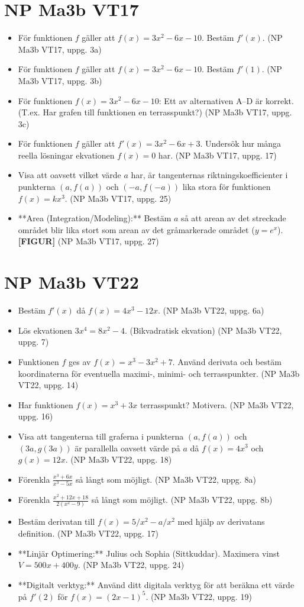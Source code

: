 \documentclass{article}
\begin{document}
\section*{NP Ma3b VT17}
\begin{itemize}
    \item För funktionen $f$ gäller att $f(x) = 3x^2 - 6x - 10$. Bestäm $f'(x)$. (NP Ma3b VT17, uppg. 3a)
    \item För funktionen $f$ gäller att $f(x) = 3x^2 - 6x - 10$. Bestäm $f'(1)$. (NP Ma3b VT17, uppg. 3b)
    \item För funktionen $f(x) = 3x^2 - 6x - 10$: Ett av alternativen A–D är korrekt. (T.ex. Har grafen till funktionen en terrasspunkt?) (NP Ma3b VT17, uppg. 3c)
    \item För funktionen $f$ gäller att $f'(x) = 3x^2 - 6x + 3$. Undersök hur många reella lösningar ekvationen $f(x)=0$ har. (NP Ma3b VT17, uppg. 17)
    \item Visa att oavsett vilket värde $a$ har, är tangenternas riktningskoefficienter i punkterna $(a, f(a))$ och $(-a, f(-a))$ lika stora för funktionen $f(x) = kx^3$. (NP Ma3b VT17, uppg. 25)
    \item **Area (Integration/Modeling):** Bestäm $a$ så att arean av det streckade området blir lika stort som arean av det gråmarkerade området ($y=e^x$). \textbf{[FIGUR]} (NP Ma3b VT17, uppg. 27)
\end{itemize}

\section*{NP Ma3b VT22}
\begin{itemize}
    \item Bestäm $f'(x)$ då $f(x) = 4x^3 - 12x$. (NP Ma3b VT22, uppg. 6a)
    \item Lös ekvationen $3x^4 = 8x^2 - 4$. (Bikvadratisk ekvation) (NP Ma3b VT22, uppg. 7)
    \item Funktionen $f$ ges av $f(x) = x^3 - 3x^2 + 7$. Använd derivata och bestäm koordinaterna för eventuella maximi-, minimi- och terrasspunkter. (NP Ma3b VT22, uppg. 14)
    \item Har funktionen $f(x) = x^3 + 3x$ terrasspunkt? Motivera. (NP Ma3b VT22, uppg. 16)
    \item Visa att tangenterna till graferna i punkterna $(a, f(a))$ och $(3a, g(3a))$ är parallella oavsett värde på $a$ då $f(x) = 4x^3$ och $g(x) = 12x$. (NP Ma3b VT22, uppg. 18)
    \item Förenkla $\frac{x^3+6x}{x^3-5x}$ så långt som möjligt. (NP Ma3b VT22, uppg. 8a)
    \item Förenkla $\frac{x^2+12x+18}{2(x^2-9)}$ så långt som möjligt. (NP Ma3b VT22, uppg. 8b)
    \item Bestäm derivatan till $f(x) = 5/x^2 - a/x^2$ med hjälp av derivatans definition. (NP Ma3b VT22, uppg. 17)
    \item **Linjär Optimering:** Julius och Sophia (Sittkuddar). Maximera vinst $V=500x+400y$. (NP Ma3b VT22, uppg. 24)
    \item **Digitalt verktyg:** Använd ditt digitala verktyg för att beräkna ett värde på $f'(2)$ för $f(x) = (2x-1)^5$. (NP Ma3b VT22, uppg. 19)
\end{itemize}
\end{document}
